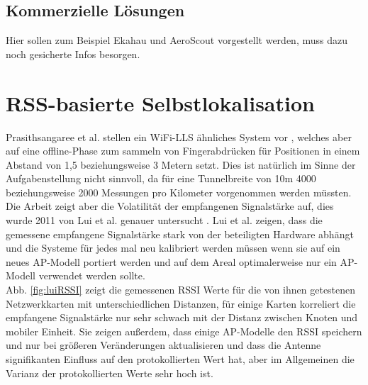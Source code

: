 \subsection{Kommerzielle Lösungen}
Hier sollen zum Beispiel Ekahau und AeroScout vorgestellt werden, muss dazu noch gesicherte Infos besorgen.

\section{RSS-basierte Selbstlokalisation}
\label{ch:Vorherige:sec:RSS-basierte}
Prasithsangaree et al. stellen ein WiFi-LLS ähnliches System vor \cite{prasithsangaree2002indoor}, welches aber auf eine offline-Phase zum sammeln von Fingerabdrücken für Positionen in einem Abstand von 1,5 beziehungsweise 3 Metern setzt. 
Dies ist natürlich im Sinne der Aufgabenstellung nicht sinnvoll, da für eine Tunnelbreite von 10m 4000 beziehungsweise 2000 Messungen pro Kilometer vorgenommen werden müssten.\\
Die Arbeit zeigt aber die Volatilität der empfangenen Signalstärke auf, dies wurde 2011 von Lui et al. genauer untersucht \cite{lui2011differences}.
Lui et al. zeigen, dass die gemessene empfangene Signalstärke stark von der beteiligten Hardware abhängt und die Systeme für jedes mal neu kalibriert werden müssen wenn sie auf ein neues AP-Modell portiert werden und auf dem Areal optimalerweise nur ein AP-Modell verwendet werden sollte. \\
Abb. \ref{fig:luiRSSI} zeigt die gemessenen RSSI Werte für die von ihnen getestenen Netzwerkkarten mit unterschiedlichen Distanzen, für einige Karten korreliert die empfangene Signalstärke nur sehr schwach mit der Distanz zwischen Knoten und mobiler Einheit.
Sie zeigen außerdem, dass einige AP-Modelle den RSSI speichern und nur bei größeren Veränderungen aktualisieren und dass die Antenne signifikanten Einfluss auf den protokollierten Wert hat, aber im Allgemeinen die Varianz der protokollierten Werte sehr hoch ist.



